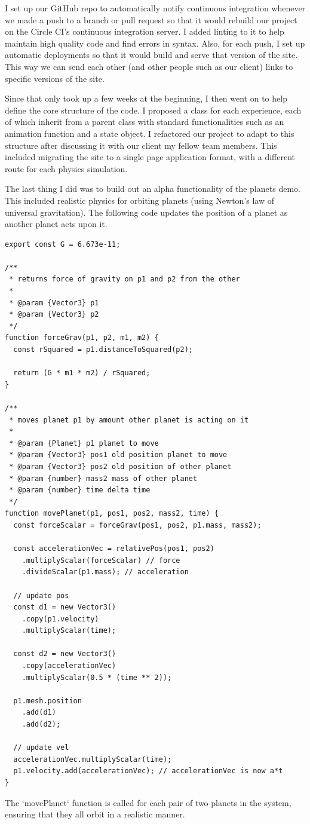 \documentclass[onecolumn, draftclsnofoot,10pt, compsoc]{IEEEtran}
\begin{document}
I set up our GitHub repo to automatically notify continuous integration whenever we made a push to a branch or pull request so that it would rebuild our project on the Circle CI's continuous integration server. I added linting to it to help maintain high quality code and find errors in syntax. Also, for each push, I set up automatic deployments so that it would build and serve that version of the site. This way we can send each other (and other people such as our client) links to specific versions of the site. 

Since that only took up a few weeks at the beginning, I then went on to help define the core structure of the code. I proposed a class for each experience, each of which inherit from a parent class with standard functionalities such as an animation function and a state object. I refactored our project to adapt to this structure after discussing it with our client my fellow team members. This included migrating the site to a single page application format, with a different route for each physics simulation.

The last thing I did was to build out an alpha functionality of the planets demo. This included realistic physics for orbiting planets (using Newton's law of universal gravitation). The following code updates the position of a planet as another planet acts upon it. 
\begin{lstlisting}
export const G = 6.673e-11;

/**
 * returns force of gravity on p1 and p2 from the other
 *
 * @param {Vector3} p1
 * @param {Vector3} p2
 */
function forceGrav(p1, p2, m1, m2) {
  const rSquared = p1.distanceToSquared(p2);

  return (G * m1 * m2) / rSquared;
}

/**
 * moves planet p1 by amount other planet is acting on it
 *
 * @param {Planet} p1 planet to move
 * @param {Vector3} pos1 old position planet to move
 * @param {Vector3} pos2 old position of other planet
 * @param {number} mass2 mass of other planet
 * @param {number} time delta time
 */
function movePlanet(p1, pos1, pos2, mass2, time) {
  const forceScalar = forceGrav(pos1, pos2, p1.mass, mass2);

  const accelerationVec = relativePos(pos1, pos2)
    .multiplyScalar(forceScalar) // force
    .divideScalar(p1.mass); // acceleration

  // update pos
  const d1 = new Vector3()
    .copy(p1.velocity)
    .multiplyScalar(time);

  const d2 = new Vector3()
    .copy(accelerationVec)
    .multiplyScalar(0.5 * (time ** 2));

  p1.mesh.position
    .add(d1)
    .add(d2);

  // update vel
  accelerationVec.multiplyScalar(time);
  p1.velocity.add(accelerationVec); // accelerationVec is now a*t
}
\end{lstlisting}
The `movePlanet` function is called for each pair of two planets in the system, ensuring that they all orbit in a realistic manner. 
\end{document}
